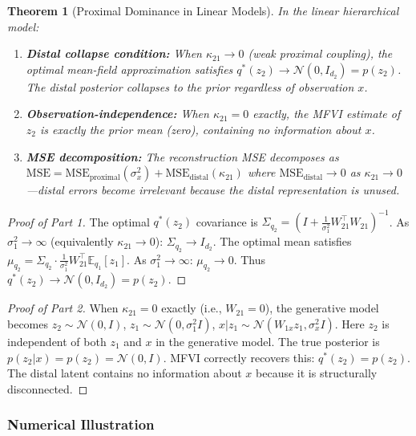 \documentclass[10pt]{article} %
\theoremstyle{plain}
\newtheorem{theorem}{Theorem}[section]
\theoremstyle{definition}
\begin{document}
\begin{theorem}[Proximal Dominance in Linear Models]
\label{thm:linear-proximal}
In the linear hierarchical model:
\begin{enumerate}
    \item \textbf{Distal collapse condition:} When $\kappa_{21} \to 0$ (weak proximal coupling), the optimal mean-field approximation satisfies $q^*(z_2) \to \mathcal{N}(0, I_{d_2}) = p(z_2)$. The distal posterior collapses to the prior regardless of observation $x$.
    
    \item \textbf{Observation-independence:} When $\kappa_{21} = 0$ exactly, the MFVI estimate of $z_2$ is exactly the prior mean (zero), containing no information about $x$.
    
    \item \textbf{MSE decomposition:} The reconstruction MSE decomposes as $\text{MSE} = \text{MSE}_{\text{proximal}}(\sigma_x^2) + \text{MSE}_{\text{distal}}(\kappa_{21})$ where $\text{MSE}_{\text{distal}} \to 0$ as $\kappa_{21} \to 0$---distal errors become irrelevant because the distal representation is unused.
\end{enumerate}
\end{theorem}

\begin{proof}[Proof of Part 1]
The optimal $q^*(z_2)$ covariance is $\Sigma_{q_2} = \left(I + \frac{1}{\sigma_1^2}W_{21}^\top W_{21}\right)^{-1}$. As $\sigma_1^2 \to \infty$ (equivalently $\kappa_{21} \to 0$): $\Sigma_{q_2} \to I_{d_2}$. The optimal mean satisfies $\mu_{q_2} = \Sigma_{q_2} \cdot \frac{1}{\sigma_1^2}W_{21}^\top \mathbb{E}_{q_1}[z_1]$. As $\sigma_1^2 \to \infty$: $\mu_{q_2} \to 0$. Thus $q^*(z_2) \to \mathcal{N}(0, I_{d_2}) = p(z_2)$.
\end{proof}

\begin{proof}[Proof of Part 2]
When $\kappa_{21} = 0$ exactly (i.e., $W_{21} = 0$), the generative model becomes $z_2 \sim \mathcal{N}(0, I)$, $z_1 \sim \mathcal{N}(0, \sigma_1^2 I)$, $x | z_1 \sim \mathcal{N}(W_{1x}z_1, \sigma_x^2 I)$. Here $z_2$ is independent of both $z_1$ and $x$ in the generative model. The true posterior is $p(z_2 | x) = p(z_2) = \mathcal{N}(0, I)$. MFVI correctly recovers this: $q^*(z_2) = p(z_2)$. The distal latent contains no information about $x$ because it is structurally disconnected.
\end{proof}

\subsubsection{Numerical Illustration}
\end{document}
